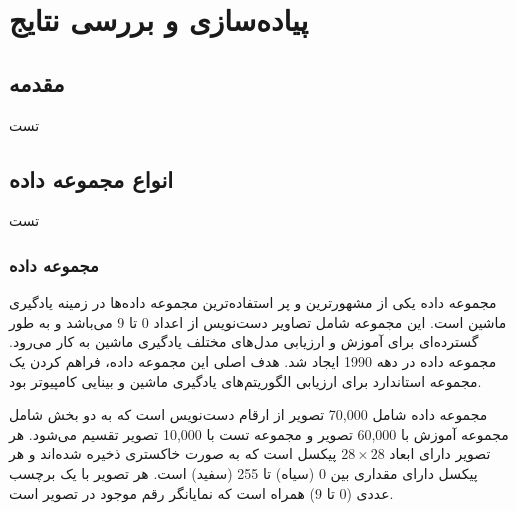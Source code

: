 \chapter{پیاده‌سازی و بررسی نتایج}

\section{مقدمه}
تست


\section{انواع مجموعه داده}
تست

\subsection{
مجموعه داده
}
مجموعه داده
یکی از مشهورترین و پر استفاده‌ترین مجموعه داده‌ها در زمینه یادگیری ماشین است. این مجموعه شامل تصاویر دست‌نویس از اعداد 0 تا 9 می‌باشد و به طور گسترده‌ای برای آموزش و ارزیابی مدل‌های مختلف یادگیری ماشین به کار می‌رود.
مجموعه داده
در دهه 1990 ایجاد شد. هدف اصلی این مجموعه داده، فراهم کردن یک مجموعه استاندارد برای ارزیابی الگوریتم‌های یادگیری ماشین و بینایی کامپیوتر بود.

مجموعه داده
شامل 70,000 تصویر از ارقام دست‌نویس است که به دو بخش شامل مجموعه آموزش با 60,000 تصویر و مجموعه تست با 10,000 تصویر تقسیم می‌شود. هر تصویر دارای ابعاد
$28 \times 28$
پیکسل است که به صورت خاکستری%
ذخیره شده‌اند و هر پیکسل دارای مقداری بین 0 (سیاه) تا 255 (سفید) است. هر تصویر با یک برچسب عددی (0 تا 9) همراه است که نمایانگر رقم موجود در تصویر است.

